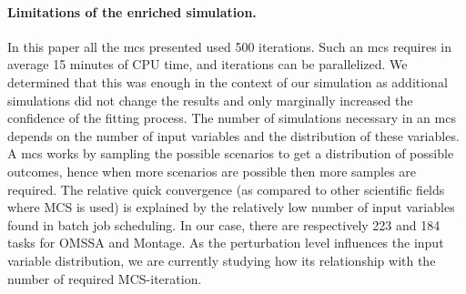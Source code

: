 \documentclass[]{llncs}
\begin{document}
\paragraph{Limitations of the enriched simulation.}\label{sec:lim}
%
In this paper  all the \ac{mcs} presented used 500 iterations. Such an \ac{mcs}
requires in average 15 minutes of  CPU time, and iterations can be parallelized.
We  determined  that  this was  enough  in  the  context  of our  simulation  as
additional simulations did not change  the results and only marginally increased
the confidence of the fitting process. The number of simulations necessary in an
\ac{mcs} depends on the number of  input variables and the distribution of these
variables.   A \ac{mcs}  works  by  sampling the  possible  scenarios  to get  a
distribution of possible  outcomes, hence when more scenarios  are possible then
more samples are required.  The relative quick convergence (as compared to other
scientific fields  where \ac{MCS} is  used) is  explained by the  relatively low
number of input variables found in batch job scheduling.  In our case, there are
respectively 223 and 184 tasks for  OMSSA and Montage. As the perturbation level
influences the  input variable distribution,  we are currently studying  how its
relationship with the number of required MCS-iteration.
\end{document}
